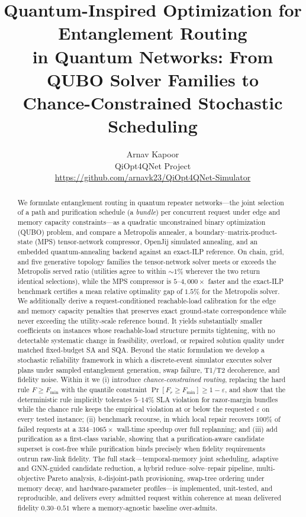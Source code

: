 \documentclass[twocolumn]{article}
\title{Quantum-Inspired Optimization for Entanglement Routing\\
in Quantum Networks: From QUBO Solver Families to\\
Chance-Constrained Stochastic Scheduling}
\author{Arnav Kapoor \\
QiOpt4QNet Project \\
\url{https://github.com/arnavk23/QiOpt4QNet-Simulator}}
\begin{document}
\raggedbottom
\maketitle

\begin{abstract}
We formulate entanglement routing in quantum repeater networks---the
joint selection of a path and purification schedule (a \emph{bundle})
per concurrent request under edge and memory capacity
constraints---as a quadratic unconstrained binary optimization (QUBO)
problem, and compare a Metropolis annealer, a boundary--matrix-product-state
(MPS) tensor-network compressor, OpenJij simulated annealing, and an
embedded quantum-annealing backend against an exact-ILP reference.  On
chain, grid, and five generative topology families the tensor-network
solver meets or exceeds the Metropolis served ratio (utilities agree
to within $\sim\!1\%$ wherever the two return identical selections),
while the MPS compressor is $5$--$4{,}000\times$ faster and the
exact-ILP benchmark certifies a mean relative optimality gap of $1.5\%$
for the Metropolis solver.  We additionally derive a request-conditioned
reachable-load calibration for the edge and memory capacity penalties
that preserves exact ground-state correspondence while never exceeding
the utility-scale reference bound.  It yields substantially smaller
coefficients on instances whose reachable-load structure permits
tightening, with no detectable systematic change in feasibility,
overload, or repaired solution quality under matched fixed-budget SA
and SQA.  Beyond the static formulation we develop a
stochastic reliability framework in which a discrete-event simulator
executes solver plans under sampled entanglement generation, swap
failure, T1/T2 decoherence, and fidelity noise.  Within it we (i)
introduce \emph{chance-constrained routing}, replacing the hard rule
$F \ge F_{\min}$ with the quantile constraint
$\Pr[F_r \ge F_{\min}] \ge 1-\varepsilon$, and show that the
deterministic rule implicitly tolerates $5$--$14\%$ SLA violation for
razor-margin bundles while the chance rule keeps the empirical
violation at or below the requested $\varepsilon$ on every tested
instance; (ii) benchmark recourse, in which local repair recovers
$100\%$ of failed requests at a $334$--$1065\times$ wall-time speedup
over full replanning; and (iii) add purification as a first-class
variable, showing that a purification-aware candidate superset is
cost-free while purification binds precisely when fidelity
requirements outrun raw-link fidelity.  The full stack---temporal-memory
joint scheduling, adaptive and GNN-guided candidate reduction, a hybrid
reduce--solve--repair pipeline, multi-objective Pareto analysis,
$k$-disjoint-path provisioning, swap-tree ordering under memory decay,
and hardware-parameter profiles---is implemented, unit-tested, and
reproducible, and delivers every admitted request within coherence at
mean delivered fidelity $0.30$--$0.51$ where a memory-agnostic baseline
over-admits. 
\end{abstract}
\end{document}
